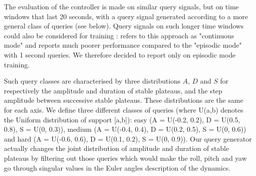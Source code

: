 \documentclass[anonymous=true,format=sigconf, screen=true, review=false]{acmart}
\begin{document}
The evaluation of the controller is made on similar query signals, but on time windows that last 20 seconds, with a query signal generated according to a more general class of queries (see below). 
Query signals on such longer time windows could also be considered for training : \cite{rl} refers to this approach as "continuous mode" and reports much poorer performance compared to the "episodic mode" with 1 second queries. We therefore decided to report only on episodic mode training. 


Such query classes are characterised by three distributions $A$, $D$ and $S$ for respectively the amplitude and duration of stable plateaus, and the step amplitude between successive stable plateaus. These distributions are the same for each axis.
We define three different classes of queries (where U(a,b) denotes the Uniform distribution of support [a,b]):
    easy (A = U(-0.2, 0.2), D = U(0.5, 0.8), S = U(0, 0.3)), 
    medium (A = U(-0.4, 0.4), D = U(0.2, 0.5), S = U(0, 0.6)) and 
    hard (A = U(-0.6, 0.6), D = U(0.1, 0.2), S = U(0, 0.9)). 
Our query generator actually changes the joint distribution of amplitude and duration of stable plateaus by filtering out those queries which would make the roll, pitch and yaw go through singular values in the Euler angles description of the dynamics. 


\end{document}
